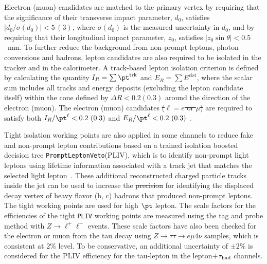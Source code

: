 \documentclass[PAPER, coverpage, atlasdraft=true, texlive=2016, UKenglish]{\ATLASLATEXPATH atlasdoc}
\providecommand{\DIFadd}[1]{{\protect\color{blue}\uwave{#1}}} %
\providecommand{\DIFdel}[1]{{\protect\color{red}\sout{#1}}}                      %
\providecommand{\DIFaddbegin}{} %
\providecommand{\DIFaddend}{} %
\providecommand{\DIFdelbegin}{} %
\providecommand{\DIFdelend}{} %
\begin{document}
Electron (muon) candidates are matched to the primary vertex by requiring that the significance of their transverse impact parameter, $d_0$, 
satisfies $|d_0/\sigma(d_0)|<5\,(3)$, where $\sigma(d_0)$ is the measured uncertainty in $d_0$,
and by requiring that their longitudinal impact parameter, $z_0$, satisfies $|z_0 \sin\theta|<0.5$~mm.
To further reduce the background from non-prompt leptons, photon conversions and hadrons, lepton candidates are also required to be isolated 
in the tracker and in the calorimeter.
A track-based lepton isolation criterion is defined by calculating the quantity $I_R = \sum \pt^{\textrm{trk}}$ and $E_R = \sum E^{\textrm{clst}}$, where
the scalar sum includes all tracks and energy deposits (excluding the lepton candidate itself) within the cone defined by $\Delta R<0.2 (0.3)$ around the %
direction of the electron (muon). The electron (muon) candidates \DIFdelbegin \DIFdel{($\ell=e$ or $\mu$) }\DIFdelend are required to satisfy both
$I_R/\pt^\ell < 0.2~(0.3)$ and $E_R/\pt^\ell < 0.2~(0.3)$ \DIFaddbegin \DIFadd{($\ell=e$ or $\mu$)}\DIFaddend .

Tight isolation working points are also applied in some channels to reduce fake and non-prompt lepton contributions based on a trained isolation boosted decision tree \texttt{PromptLeptonVeto}(PLIV), which is \DIFaddbegin \DIFadd{used }\DIFaddend to identify non-prompt light leptons using lifetime information associated with a track jet that matches the selected light lepton~\cite{ATLAS-CONF-2019-045}. These additional reconstructed charged particle tracks inside the jet can be
used to increase the \DIFdelbegin \DIFdel{precision }\DIFdelend \DIFaddbegin \DIFadd{accuracy }\DIFaddend for identifying the displaced decay vertex of heavy flavor (b, c) hadrons that produced non-prompt leptons.
The tight working points are used for high $\pt$ lepton.
The scale factors for the efficiencies of the tight \texttt{PLIV} working points are measured using the tag and probe method
with $Z\rightarrow \ell^+\ell^-$ events. These scale factors have also been checked for the electron or muon from the tau decay
using $Z\rightarrow\tau\tau\rightarrow e\mu4\nu$ samples, which is consistent at 2\% level. To be conservative, an
additional uncertainty of $\pm 2\%$ is considered for the PLIV efficiency for the tau-lepton in the lepton+$\tau_\text{had}$ channels.
\end{document}
